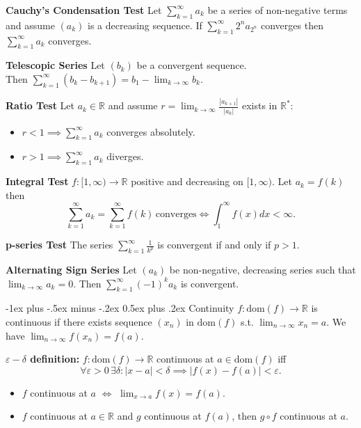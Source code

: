 \documentclass[10pt,landscape]{article}
\makeatletter
\renewcommand{\section}{\@startsection{section}{1}{0mm}%
                                {-1ex plus -.5ex minus -.2ex}%
                                {0.5ex plus .2ex}%
                                {\normalfont\large\bfseries}}
\newcommand{\dom}[1]{\textrm{dom}\!\left(#1\right)}
\makeatother
\begin{document}
\begin{multicols}{3}
\textbf{Cauchy's Condensation Test} Let $\displaystyle \sum_{k=1}^{\infty} a_k$ be a series of non-negative terms and assume $(a_k)$ is a decreasing sequence. If $\displaystyle \sum_{k=1}^{\infty} 2^n a_{2^n}$ converges then $\displaystyle \sum_{k=1}^{\infty} a_k$ converges.

\textbf{Telescopic Series} Let $(b_k)$ be a convergent sequence. \\Then $\displaystyle \sum_{k=1}^{\infty}(b_k - b_{k+1}) = b_1 - \lim_{k \rightarrow \infty} b_k.$

\textbf{Ratio Test} Let $a_k \in \mathbb{R}$ and assume $r = \lim_{k \to \infty} \frac{|a_{k+1}|}{|a_k|}$ exists in $\mathbb{R}^*$:

    \begin{itemize}
        \item $r < 1 \implies \displaystyle \sum_{k=1}^{\infty}a_k$ converges absolutely.
        \item $r > 1 \implies \displaystyle \sum_{k=1}^{\infty}a_k$ diverges.
    \end{itemize}

\textbf{Integral Test} $f\!: [1, \infty) \to \mathbb{R}$ positive and decreasing on $[1, \infty)$. Let $a_k = f(k)$ then $$\sum_{k=1}^{\infty} a_k = \displaystyle \sum_{k=1}^{\infty} f(k) \,\textrm{converges} \iff \int_1^{\infty}f(x)dx < \infty.$$

\textbf{p-series Test} The series $\displaystyle \sum_{k=1}^{\infty} \frac{1}{k^p}$ is convergent if and only if $p > 1$.

\textbf{Alternating Sign Series} Let $(a_k)$ be non-negative, decreasing series such that $\displaystyle \lim_{k \to \infty} a_k = 0$. Then $\displaystyle \sum_{k=1}^{\infty}(-1)^ka_k$ is convergent.

\section{Continuity}
$f\!: \dom{f} \to \mathbb{R}$ is continuous if there exists sequence $(x_n)$ in $\dom{f}$ s.t. $\displaystyle \lim_{n \to \infty}{x_n} = a$. We have $\displaystyle \lim_{n \to \infty} f(x_n) = f(a)$.

\textbf{$\varepsilon\!-\!\delta$ definition:} $f\!: \dom{f} \to \mathbb{R}$ continuous at $a \in \dom{f}$ iff \[ \forall \varepsilon > 0 \,\exists \delta: |x-a| < \delta \implies |f(x) - f(a)| < \varepsilon. \]

\begin{itemize}
    \item $f$ continuous at $a$ $\iff$ $\lim_{x \to a} f(x) = f(a)$.
    \item $f$ continuous at $a \in \mathbb{R}$ and $g$ continuous at $f(a)$, then $g \circ f$ continuous at $a$.
\end{itemize}


\end{multicols}
\end{document}
